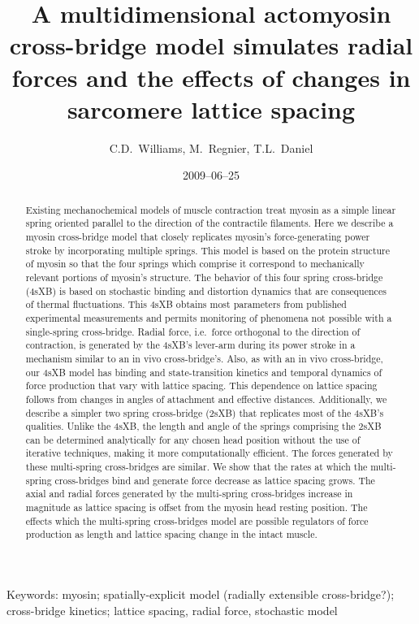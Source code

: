 \documentclass[]{article}
\title{A multidimensional actomyosin cross-bridge model simulates radial forces and the effects of changes in sarcomere lattice spacing}
\author{C.D.\ Williams, M.\ Regnier, T.L.\ Daniel}
\date{2009--06--25}
\begin{document}
\maketitle{}

\begin{abstract} 
Existing mechanochemical models of muscle contraction treat myosin as a simple linear spring oriented parallel to the direction of the contractile filaments.
Here we describe a myosin cross-bridge model that closely replicates myosin's force-generating power stroke by incorporating multiple springs. 
This model is based on the protein structure of myosin so that the four springs which comprise it correspond to mechanically relevant portions of myosin's structure.
The behavior of this four spring cross-bridge (4sXB) is based on stochastic binding and distortion dynamics that are consequences of thermal fluctuations.  
This 4sXB obtains most parameters from published experimental measurements and permits monitoring of phenomena not possible with a single-spring cross-bridge.
Radial force, i.e.\ force orthogonal to the direction of contraction, is generated by the 4sXB's lever-arm during its power stroke in a mechanism similar to an in vivo cross-bridge's. 
Also, as with an in vivo cross-bridge, our 4sXB model has binding and state-transition kinetics and temporal dynamics of force production that vary with lattice spacing. 
This dependence on lattice spacing follows from changes in angles of attachment and effective distances. 
Additionally, we describe a simpler two spring cross-bridge (2sXB) that replicates most of the 4sXB's qualities. 
Unlike the 4sXB, the length and angle of the springs comprising the 2sXB can be determined analytically for any chosen head position without the use of iterative techniques,  making it more computationally efficient.
The forces generated by these multi-spring cross-bridges are similar. 
We show that the rates at which the multi-spring cross-bridges bind and generate force decrease as lattice spacing grows. 
The axial and radial forces generated by the multi-spring cross-bridges increase in magnitude as lattice spacing is offset from the myosin head resting position. 
The effects which the multi-spring cross-bridges model are possible regulators of force production as length and lattice spacing change in the intact muscle.
\end{abstract}

Keywords: myosin; spatially-explicit model (radially extensible cross-bridge?); cross-bridge kinetics; lattice spacing, radial force, stochastic model
\end{document}
